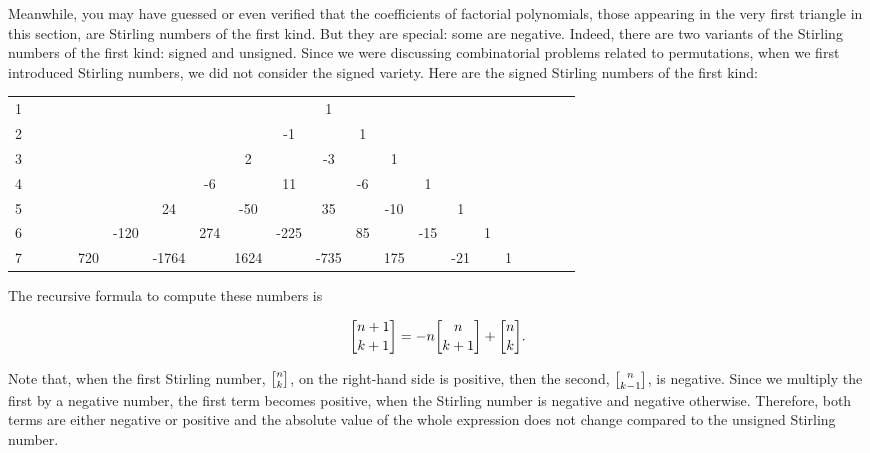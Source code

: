 \documentclass[tikz]{scrreprt}
\begin{document}

Meanwhile, you may have guessed or even verified
that the coefficients of factorial polynomials,
those appearing in the very first triangle in
this section, are Stirling numbers of the first kind.
But they are special: some are negative.
Indeed, there are two variants of
the Stirling numbers of the first kind:
signed and unsigned. Since we were discussing
combinatorial problems related to permutations,
when we first introduced Stirling numbers,
we did not consider the signed variety.
Here are the signed Stirling numbers 
of the first kind:

\begin{tabular}{l c c c c c c c c c c c c c c c c c c c c}
1 &   &   &   &   &    &      &      &       &     &   1 &      &      &     &    &    &   &   &   &   &  \\
2 &   &   &   &   &    &      &      &       &  -1 &     &    1 &      &     &    &    &   &   &   &   &  \\
3 &   &   &   &   &    &      &      &     2 &     &  -3 &      &    1 &     &    &    &   &   &   &   &  \\
4 &   &   &   &   &    &      &   -6 &       &  11 &     &   -6 &      &   1 &    &    &   &   &   &   &  \\
5 &   &   &   &   &    &   24 &      &   -50 &     &  35 &      &  -10 &     &  1 &    &   &   &   &   &  \\
6 &   &   &   &   &-120&      &  274 &       &-225 &     &   85 &      & -15 &    &  1 &   &   &   &   &  \\   
7 &   &   &   &720&    & -1764&      &  1624 &     &-735 &      &  175 &     &-21 &    & 1 &   &   &   &  
\end{tabular}

The recursive formula to compute these numbers is

\begin{equation}
\stirlingOne{n+1}{k+1} = -n\stirlingOne{n}{k+1} + \stirlingOne{n}{k}.
\end{equation}

Note that, when the first Stirling number, $\stirlingOne{n}{k}$,
on the right-hand side is positive,
then the second, $\stirlingOne{n}{k-1}$, 
is negative. Since we multiply the first by a negative
number, the first term becomes positive, when the Stirling number is
negative and negative otherwise. Therefore, both terms are either
negative or positive and the absolute value of the whole expression
does not change compared
to the unsigned Stirling number.
\end{document}
